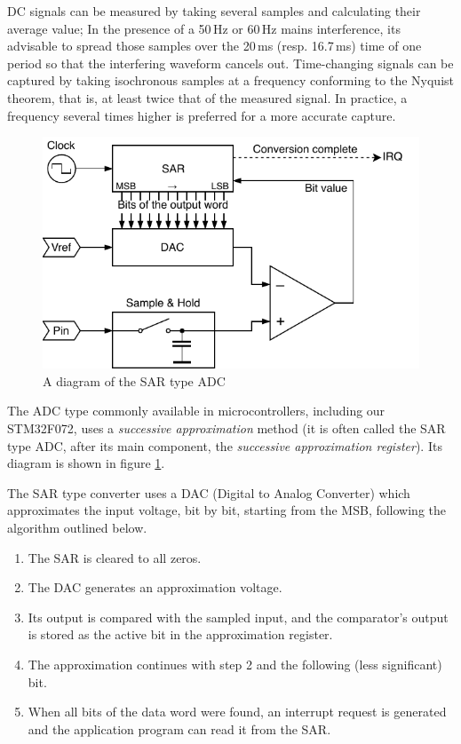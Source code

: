 DC signals can be measured by taking several samples and calculating their average value; In the presence of a 50\,Hz or 60\,Hz mains interference, its advisable to spread those samples over the 20\,ms (resp. 16.7\,ms) time of one period so that the interfering waveform cancels out. Time-changing signals can be captured by taking isochronous samples at a frequency conforming to the Nyquist theorem, that is, at least twice that of the measured signal. In practice, a frequency several times higher is preferred for a more accurate capture.

\begin{figure}
	\centering
	\includegraphics[scale=1] {img/sar-adc.pdf}
	\caption{\label{fig:adc-sar}A diagram of the SAR type ADC}
\end{figure}

The ADC type commonly available in microcontrollers, including our STM32F072, uses a \textit{successive approximation} method (it is often called the SAR type ADC, after its main component, the \textit{successive approximation register}). Its diagram is shown in figure \ref{fig:adc-sar}. 

The SAR type converter uses a DAC (Digital to Analog Converter) which approximates the input voltage, bit by bit, starting from the MSB, following the algorithm outlined below.

\begin{enumerate}
	\item The SAR is cleared to all zeros.
	\item The DAC generates an approximation voltage.
	\item Its output is compared with the sampled input, and the comparator's output is stored as the active bit in the approximation register.
	\item The approximation continues with step 2 and the following (less significant) bit.
	\item When all bits of the data word were found, an interrupt request is generated and the application program can read it from the SAR.
\end{enumerate} 

